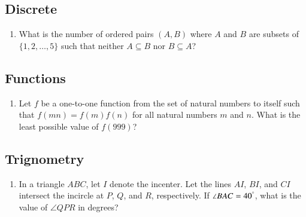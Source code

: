 \documentclass[12pt,letter paper]{article}
\providecommand{\brak}[1]{\ensuremath{\left(#1\right)}}
\begin{document}
\begin{center}
	\section*{Discrete}
\end{center}
\begin{enumerate}
	\item What is the number of ordered pairs $\brak{A, B}$ where $A$ and $B$ are subsets of $\{1, 2, \ldots, 5\}$ such that neither $A \subseteq B$ nor $B \subseteq A$?
\end{enumerate}
\begin{center}
	\section*{Functions}
\end{center}
\begin{enumerate}
	\item Let $f$ be a one-to-one function from the set of natural numbers to itself such that $f\brak{mn} = f\brak{m} f\brak{n}$ for all natural numbers $m$ and $n$. What is the least possible value of $f\brak{999}$?
\end{enumerate}
\begin{center}
	\section*{Trignometry}
\end{center}
\begin{enumerate}
\item In a triangle $ABC$, let $I$ denote the incenter. Let the lines $AI$, $BI$, and $CI$ intersect the incircle at $P$, $Q$, and $R$, respectively. If $\angle BAC = 40^\degree$, what is the value of $\angle QPR$ in degrees?
\end{enumerate}
\end{document}
